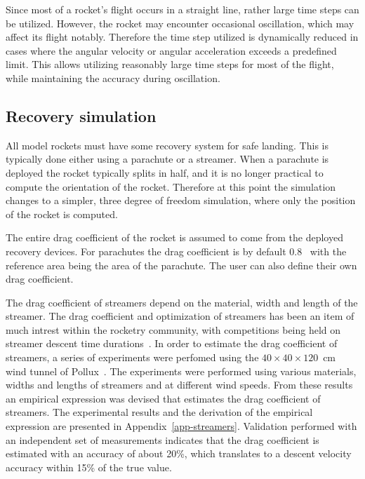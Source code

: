 Since most of a rocket's flight occurs in a straight line, rather
large time steps can be utilized.  However, the rocket may encounter
occasional oscillation, which may affect its flight notably.
Therefore the time step utilized is dynamically reduced in cases where
the angular velocity or angular acceleration exceeds a predefined
limit.  This allows utilizing reasonably large time steps for most of
the flight, while maintaining the accuracy during oscillation.


\subsection{Recovery simulation}

All model rockets must have some recovery system for safe landing.
This is typically done either using a parachute or a streamer.  When a
parachute is deployed the rocket typically splits in half, and it is
no longer practical to compute the orientation of the rocket.
Therefore at this point the simulation changes to a simpler, three
degree of freedom simulation, where only the position of the rocket is
computed.

The entire drag coefficient of the rocket is assumed to come from the
deployed recovery devices.  For parachutes the drag coefficient is
by default 0.8~\cite[p.~13-23]{hoerner} with the reference area being the
area of the parachute.  The user can also define their own drag
coefficient.

The drag coefficient of streamers depend on the material, width and
length of the streamer.  The drag coefficient and optimization of
streamers has been an item of much intrest within the rocketry
community, with competitions being held on streamer descent time
durations~\cite{streamer-optimization}.  In order to estimate the drag
coefficient of streamers, a series of experiments were perfomed using
the $40\times40\times120$~cm wind tunnel of
Pollux~\cite{pollux-wind-tunnel}.  The experiments were performed
using various materials, widths and lengths of streamers and at
different wind speeds.  From these results an empirical expression was
devised that estimates the drag coefficient of streamers.  The
experimental results and the derivation of the empirical expression are
presented in Appendix~\ref{app-streamers}.  Validation performed with
an independent set of measurements indicates that the drag coefficient
is estimated with an accuracy of about 20\%, which translates to a
descent velocity accuracy within 15\% of the true value.




